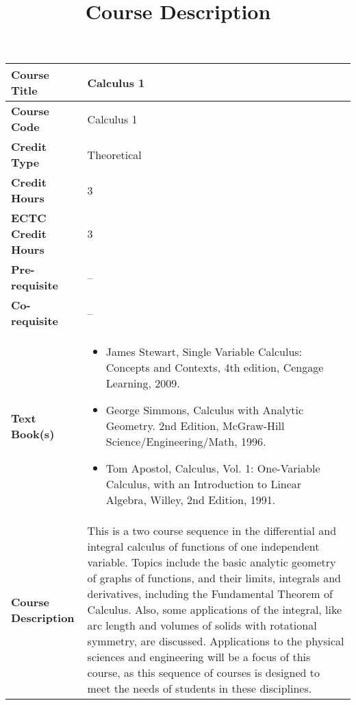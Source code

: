 \documentclass[11pt]{article}
\title{Course Description}
\begin{document}
\maketitle









\begin{table}[h!]
\begin{tabular}{|l|l|}
\hline
\textbf{Course Title}       &  Calculus 1\\ \hline
\textbf{Course Code}       &  Calculus 1\\ \hline
\textbf{Credit Type}        &   Theoretical \\ \hline
\textbf{Credit Hours}       &  3\\ \hline
\textbf{ECTC Credit Hours}       &  3\\ \hline
\textbf{Pre-requisite}       & --  \\ \hline
\textbf{Co-requisite}       &  -- \\ \hline
\textbf{Text Book(s)}       & \begin{minipage}{.70\textwidth}
\begin{itemize} \itemsep-0.4em
	\vspace{3mm}
	\item James Stewart, Single Variable Calculus: Concepts and Contexts, 4th edition, Cengage Learning, 2009.
	\item George Simmons, Calculus with Analytic Geometry. 2nd Edition, McGraw-Hill Science/Engineering/Math, 1996.
	\item Tom Apostol, Calculus, Vol. 1: One-Variable Calculus, with an Introduction to Linear Algebra, Willey, 2nd Edition, 1991.
	\vspace{3mm}
\end{itemize}
\end{minipage}\\ \hline
\textbf{Course Description} & \begin{minipage}{.70\textwidth}
\vspace{3mm}

This is a two course sequence in the differential and integral calculus of functions of one independent variable. Topics include the basic analytic geometry of graphs of functions, and their limits, integrals and derivatives, including the Fundamental Theorem of Calculus. Also, some applications of the integral, like arc length and volumes of solids with rotational symmetry, are discussed. Applications to the physical sciences and engineering will be a focus of this course, as this sequence of courses is designed to meet the needs of students in these disciplines.
\newline


\end{minipage}
\end{tabular}
\end{table}
\end{document}
